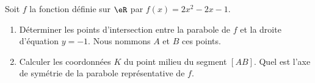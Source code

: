 
\begin{exercice}\label{exosmath-0391}

    Soit $f$ la fonction définie sur \( \eR\) par \( f(x)=2x^2-2x-1\).
    \begin{enumerate}
        \item
            Déterminer les points d'intersection entre la parabole de \( f\) et la droite d'équation \( y=-1\). Nous nommons \( A\) et \( B\) ces points.
        \item
            Calculer les coordonnées \( K\) du point milieu du segment \( [AB]\). Quel est l'axe de symétrie de la parabole représentative de \( f\).
    \end{enumerate}

\end{exercice}
